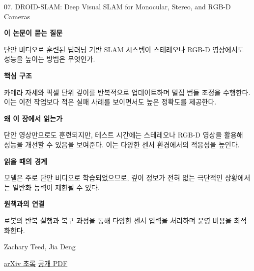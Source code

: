 \documentclass[11pt,openany]{book}
\begin{document}
\begin{termcard}{07. DROID-SLAM: Deep Visual SLAM for Monocular, Stereo, and RGB-D Cameras}

\par

\medskip

{\sffamily\bfseries\color{deepblue} 이 논문이 묻는 질문}\par

단안 비디오로 훈련된 딥러닝 기반 SLAM 시스템이 스테레오나 RGB-D 영상에서도 성능을 높이는 방법은 무엇인가.

\smallskip

{\sffamily\bfseries\color{deepblue} 핵심 구조}\par

카메라 자세와 픽셀 단위 깊이를 반복적으로 업데이트하며 밀집 번들 조정을 수행한다. 이는 이전 작업보다 적은 실패 사례를 보이면서도 높은 정확도를 제공한다.

\smallskip

{\sffamily\bfseries\color{deepblue} 왜 이 장에서 읽는가}\par

단안 영상만으로도 훈련되지만, 테스트 시간에는 스테레오나 RGB-D 영상을 활용해 성능을 개선할 수 있음을 보여준다. 이는 다양한 센서 환경에서의 적응성을 높인다.

\smallskip

{\sffamily\bfseries\color{coral} 읽을 때의 경계}\par

모델은 주로 단안 비디오로 학습되었으므로, 깊이 정보가 전혀 없는 극단적인 상황에서는 일반화 능력이 제한될 수 있다.

\smallskip

{\sffamily\bfseries\color{teal} 원책과의 연결}\par

로봇의 반복 실행과 복구 과정을 통해 다양한 센서 입력을 처리하며 운영 비용을 최적화한다.

\medskip

{\footnotesize\color{muted} Zachary Teed, Jia Deng\par

\href{https://arxiv.org/abs/2108.10869}{arXiv 초록} \quad \href{https://arxiv.org/pdf/2108.10869}{공개 PDF}\par}

\end{termcard}
\end{document}
